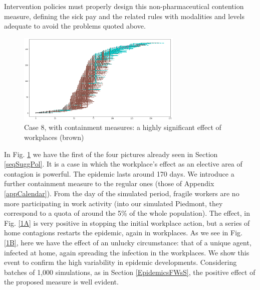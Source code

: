 \documentclass[11pt]{article}
\begin{document}
Intervention policies must properly design this non-pharmaceutical contention measure, defining the sick pay and the related rules with modalities and levels adequate to avoid the problems quoted above.

\begin{figure}[H]
\begin{center}
\includegraphics[width=0.7\textwidth]{withShort1.png}%
\caption{Case 8, with containment measures: a highly significant effect of workplaces (brown)}
\label{1}
\end{center}
\end{figure}


In Fig. \ref{1} we have the first of the four pictures already seen in Section \ref{seqSuggPol}. It is a case in which the workplace's effect as an elective area of contagion is powerful. The epidemic lasts around 170 days. We introduce a further containment measure to the regular ones (those of Appendix \ref{appCalendar}). From the  day of the simulated period, fragile workers are no more participating in work activity (into our simulated Piedmont, they correspond to a quota of around the 5\% of the whole population). The effect, in Fig. \ref{1A} is very positive in stopping the initial workplace action, but a series of home contagions restarts the epidemic, again in workplaces. As we see in Fig. \ref{1B}, here we have the effect of an unlucky circumstance: that of a unique agent, infected at home, again spreading the infection in the workplaces. We show this event to confirm the high variability in epidemic developments. Considering batches of 1,000 simulations, as in Section \ref{EpidemicsFWsS}, the positive effect of the proposed measure is well evident.
\end{document}
